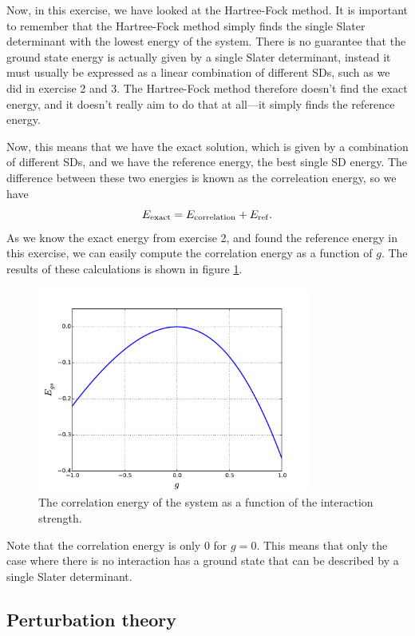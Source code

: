 \documentclass[a4paper, 11pt, notitlepage, english]{article}
\begin{document}
Now, in this exercise, we have looked at the Hartree-Fock method. It is important to remember that the Hartree-Fock method simply finds the single Slater determinant with the lowest energy of the system. There is no guarantee that the ground state energy is actually given by a single Slater determinant, instead it must usually be expressed as a linear combination of different SDs, such as we did in exercise 2 and 3. The Hartree-Fock method therefore doesn't find the exact energy, and it doesn't really aim to do that at all---it simply finds the reference energy.

Now, this means that we have the exact solution, which is given by a combination of different SDs, and we have the reference energy, the best single SD energy. The difference between these two energies is known as the correleation energy, so we have
$$E_{\rm exact} = E_{\rm correlation} + E_{\rm ref}.$$
As we know the exact energy from exercise 2, and found the reference energy in this exercise, we can easily compute the correlation energy as a function of $g$. The results of these calculations is shown in figure \ref{fig:correlation_energy}.

\begin{figure}[htbp]
\centering 
\includegraphics[width=0.8\textwidth]{proj2_correlation}
\caption{The correlation energy of the system as a function of the interaction strength. \label{fig:correlation_energy}}
\end{figure}

Note that the correlation energy is only $0$ for $g=0$. This means that only the case where there is no interaction has a ground state that can be described by a single Slater determinant.

\subsection*{Perturbation theory}
\end{document}
